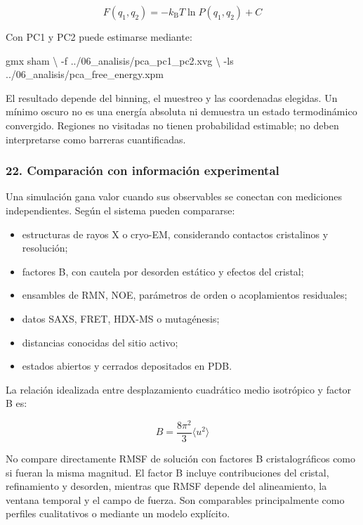 \documentclass[
  spanish,
  11pt,
  a4paper]{article}
\newenvironment{Shaded}{\begin{snugshade}}{\end{snugshade}}
\newcommand{\AttributeTok}[1]{\textcolor[rgb]{0.13,0.29,0.53}{#1}}
\newcommand{\DataTypeTok}[1]{\textcolor[rgb]{0.13,0.29,0.53}{#1}}
\newcommand{\ExtensionTok}[1]{#1}
\newcommand{\NormalTok}[1]{#1}
\providecommand{\tightlist}{%
  \setlength{\itemsep}{0pt}\setlength{\parskip}{0pt}}
\begin{document}
\[
F(q_1,q_2)=-k_{\mathrm B}T\ln P(q_1,q_2)+C
\]

Con PC1 y PC2 puede estimarse mediante:

\begin{Shaded}
\begin{Highlighting}[]
\ExtensionTok{gmx}\NormalTok{ sham }\DataTypeTok{\textbackslash{}}
    \AttributeTok{{-}f}\NormalTok{ ../06\_analisis/pca\_pc1\_pc2.xvg }\DataTypeTok{\textbackslash{}}
    \AttributeTok{{-}ls}\NormalTok{ ../06\_analisis/pca\_free\_energy.xpm}
\end{Highlighting}
\end{Shaded}

El resultado depende del binning, el muestreo y las coordenadas
elegidas. Un mínimo oscuro no es una energía absoluta ni demuestra un
estado termodinámico convergido. Regiones no visitadas no tienen
probabilidad estimable; no deben interpretarse como barreras
cuantificadas.

\subsubsection{22. Comparación con información
experimental}\label{comparaciuxf3n-con-informaciuxf3n-experimental}

Una simulación gana valor cuando sus observables se conectan con
mediciones independientes. Según el sistema pueden compararse:

\begin{itemize}
\tightlist
\item
  estructuras de rayos X o cryo-EM, considerando contactos cristalinos y
  resolución;
\item
  factores B, con cautela por desorden estático y efectos del cristal;
\item
  ensambles de RMN, NOE, parámetros de orden o acoplamientos residuales;
\item
  datos SAXS, FRET, HDX-MS o mutagénesis;
\item
  distancias conocidas del sitio activo;
\item
  estados abiertos y cerrados depositados en PDB.
\end{itemize}

La relación idealizada entre desplazamiento cuadrático medio isotrópico
y factor B es:

\[
B=\frac{8\pi^2}{3}\langle u^2\rangle
\]

No compare directamente RMSF de solución con factores B cristalográficos
como si fueran la misma magnitud. El factor B incluye contribuciones del
cristal, refinamiento y desorden, mientras que RMSF depende del
alineamiento, la ventana temporal y el campo de fuerza. Son comparables
principalmente como perfiles cualitativos o mediante un modelo
explícito.
\end{document}
